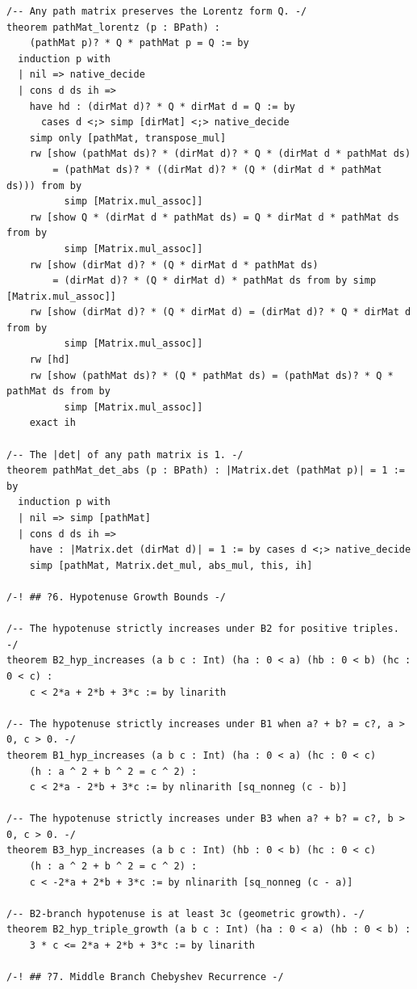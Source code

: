 \documentclass[11pt,twoside,openright]{book}
\theoremstyle{definition}
\theoremstyle{remark}
\begin{document}
\begin{lstlisting}[style=lean]
/-- Any path matrix preserves the Lorentz form Q. -/
theorem pathMat_lorentz (p : BPath) :
    (pathMat p)? * Q * pathMat p = Q := by
  induction p with
  | nil => native_decide
  | cons d ds ih =>
    have hd : (dirMat d)? * Q * dirMat d = Q := by
      cases d <;> simp [dirMat] <;> native_decide
    simp only [pathMat, transpose_mul]
    rw [show (pathMat ds)? * (dirMat d)? * Q * (dirMat d * pathMat ds)
        = (pathMat ds)? * ((dirMat d)? * (Q * (dirMat d * pathMat ds))) from by
          simp [Matrix.mul_assoc]]
    rw [show Q * (dirMat d * pathMat ds) = Q * dirMat d * pathMat ds from by
          simp [Matrix.mul_assoc]]
    rw [show (dirMat d)? * (Q * dirMat d * pathMat ds)
        = (dirMat d)? * (Q * dirMat d) * pathMat ds from by simp [Matrix.mul_assoc]]
    rw [show (dirMat d)? * (Q * dirMat d) = (dirMat d)? * Q * dirMat d from by
          simp [Matrix.mul_assoc]]
    rw [hd]
    rw [show (pathMat ds)? * (Q * pathMat ds) = (pathMat ds)? * Q * pathMat ds from by
          simp [Matrix.mul_assoc]]
    exact ih

/-- The |det| of any path matrix is 1. -/
theorem pathMat_det_abs (p : BPath) : |Matrix.det (pathMat p)| = 1 := by
  induction p with
  | nil => simp [pathMat]
  | cons d ds ih =>
    have : |Matrix.det (dirMat d)| = 1 := by cases d <;> native_decide
    simp [pathMat, Matrix.det_mul, abs_mul, this, ih]

/-! ## ?6. Hypotenuse Growth Bounds -/

/-- The hypotenuse strictly increases under B2 for positive triples. -/
theorem B2_hyp_increases (a b c : Int) (ha : 0 < a) (hb : 0 < b) (hc : 0 < c) :
    c < 2*a + 2*b + 3*c := by linarith

/-- The hypotenuse strictly increases under B1 when a? + b? = c?, a > 0, c > 0. -/
theorem B1_hyp_increases (a b c : Int) (ha : 0 < a) (hc : 0 < c)
    (h : a ^ 2 + b ^ 2 = c ^ 2) :
    c < 2*a - 2*b + 3*c := by nlinarith [sq_nonneg (c - b)]

/-- The hypotenuse strictly increases under B3 when a? + b? = c?, b > 0, c > 0. -/
theorem B3_hyp_increases (a b c : Int) (hb : 0 < b) (hc : 0 < c)
    (h : a ^ 2 + b ^ 2 = c ^ 2) :
    c < -2*a + 2*b + 3*c := by nlinarith [sq_nonneg (c - a)]

/-- B2-branch hypotenuse is at least 3c (geometric growth). -/
theorem B2_hyp_triple_growth (a b c : Int) (ha : 0 < a) (hb : 0 < b) :
    3 * c <= 2*a + 2*b + 3*c := by linarith

/-! ## ?7. Middle Branch Chebyshev Recurrence -/


\end{lstlisting}
\end{document}
